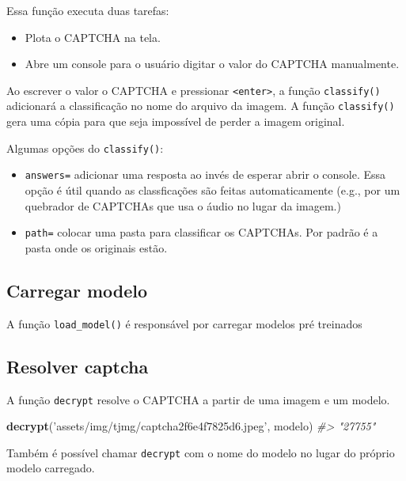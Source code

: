 \documentclass[12pt,]{report}
\newenvironment{Shaded}{\begin{snugshade}}{\end{snugshade}}
\newcommand{\CommentTok}[1]{\textcolor[rgb]{0.56,0.35,0.01}{\textit{#1}}}
\newcommand{\KeywordTok}[1]{\textcolor[rgb]{0.13,0.29,0.53}{\textbf{#1}}}
\newcommand{\NormalTok}[1]{#1}
\newcommand{\OperatorTok}[1]{\textcolor[rgb]{0.81,0.36,0.00}{\textbf{#1}}}
\newcommand{\StringTok}[1]{\textcolor[rgb]{0.31,0.60,0.02}{#1}}
\providecommand{\tightlist}{%
  \setlength{\itemsep}{0pt}\setlength{\parskip}{0pt}}
\begin{document}
Essa função executa duas tarefas:

\begin{itemize}
\tightlist
\item
  Plota o CAPTCHA na tela.
\item
  Abre um console para o usuário digitar o valor do CAPTCHA manualmente.
\end{itemize}

Ao escrever o valor o CAPTCHA e pressionar \texttt{\textless{}enter\textgreater{}}, a função \texttt{classify()} adicionará a classificação no nome do arquivo da imagem. A função \texttt{classify()} gera uma cópia para que seja impossível de perder a imagem original.

Algumas opções do \texttt{classify()}:

\begin{itemize}
\tightlist
\item
  \texttt{answers=} adicionar uma resposta ao invés de esperar abrir o console. Essa opção é útil quando as classficações são feitas automaticamente (e.g., por um quebrador de CAPTCHAs que usa o áudio no lugar da imagem.)
\item
  \texttt{path=} colocar uma pasta para classificar os CAPTCHAs. Por padrão é a pasta onde os originais estão.
\end{itemize}

\hypertarget{carregar-modelo}{%
\subsection{Carregar modelo}\label{carregar-modelo}}

A função \texttt{load\_model()} é responsável por carregar modelos pré treinados

\begin{Shaded}
\end{Shaded}

\hypertarget{resolver-captcha}{%
\subsection{Resolver captcha}\label{resolver-captcha}}

A função \texttt{decrypt} resolve o CAPTCHA a partir de uma imagem e um modelo.

\begin{Shaded}
\begin{Highlighting}[]
\KeywordTok{decrypt}\NormalTok{(}\StringTok{'assets/img/tjmg/captcha2f6e4f7825d6.jpeg'}\NormalTok{, modelo)}
\CommentTok{#> "27755"}
\end{Highlighting}
\end{Shaded}

Também é possível chamar \texttt{decrypt} com o nome do modelo no lugar do próprio modelo carregado.


\end{document}
